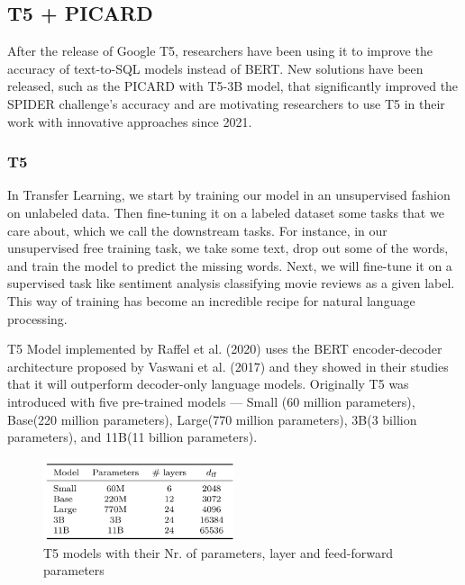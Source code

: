 \subsection{T5 + PICARD} \label{picard}


After the release of Google T5, researchers have been using it to improve the accuracy of text-to-SQL models instead of BERT. New solutions have been released, such as the PICARD with T5-3B model, that significantly improved the SPIDER challenge's accuracy and are motivating researchers to use T5 in their work with innovative approaches since 2021.

\subsubsection{T5}

In Transfer Learning, we start by training our model in an unsupervised fashion on unlabeled data. Then fine-tuning it on a labeled dataset some tasks that we care about, which we call the downstream tasks. For instance, in our unsupervised free training task, we take some text, drop out some of the words, and train the model to predict the missing words. Next, we will fine-tune it on a supervised task like sentiment analysis classifying movie reviews as a given label. This way of training has become an incredible recipe for natural language processing.

T5 Model implemented by Raffel et al. (2020)\cite{raffel_exploring_2020} uses the BERT encoder-decoder architecture proposed by Vaswani et al. (2017) \cite{devlin-etal-2019-bert} and they showed in their studies that it will outperform decoder-only language models. Originally T5 was introduced with five pre-trained models — Small (60 million parameters), Base(220 million parameters), Large(770 million parameters), 3B(3 billion parameters), and 11B(11 billion parameters)\cite{raffel_exploring_2020}.

\begin{figure}[h]
    \centering
    \includegraphics[width=0.5\textwidth]{pics/picard/t5-size.png}
    \caption{T5 models with their Nr. of parameters, layer and feed-forward parameters\cite{raffel_exploring_2020}}
\end{figure}

